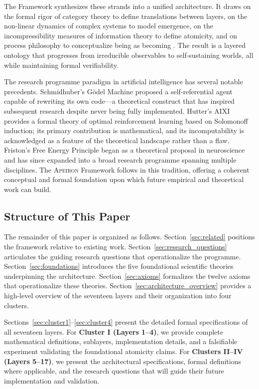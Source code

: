 The \Apeiron{} Framework synthesizes these strands into a unified architecture. It draws on the formal rigor of category theory to define translations between layers, on the non-linear dynamics of complex systems to model emergence, on the incompressibility measures of information theory to define atomicity, and on process philosophy to conceptualize being as becoming \cite{simondon1992}. The result is a layered ontology that progresses from irreducible observables to self-sustaining worlds, all while maintaining formal verifiability.

The research programme paradigm in artificial intelligence has several notable precedents. Schmidhuber's Gödel Machine \cite{schmidhuber2007} proposed a self-referential agent capable of rewriting its own code---a theoretical construct that has inspired subsequent research despite never being fully implemented. Hutter's AIXI \cite{hutter2005} provides a formal theory of optimal reinforcement learning based on Solomonoff induction; its primary contribution is mathematical, and its incomputability is acknowledged as a feature of the theoretical landscape rather than a flaw. Friston's Free Energy Principle \cite{friston2010} began as a theoretical proposal in neuroscience and has since expanded into a broad research programme spanning multiple disciplines. The \textsc{Apeiron} Framework follows in this tradition, offering a coherent conceptual and formal foundation upon which future empirical and theoretical work can build.

\subsection{Structure of This Paper}
\label{subsec:structure}

The remainder of this paper is organized as follows. Section~\ref{sec:related} positions the framework relative to existing work. Section~\ref{sec:research_questions} articulates the guiding research questions that operationalize the programme. Section~\ref{sec:foundations} introduces the five foundational scientific theories underpinning the architecture. Section~\ref{sec:axioms} formalizes the twelve axioms that operationalize these theories. Section~\ref{sec:architecture_overview} provides a high-level overview of the seventeen layers and their organization into four clusters.

Sections~\ref{sec:cluster1}--\ref{sec:cluster4} present the detailed formal specifications of all seventeen layers. For \textbf{Cluster I (Layers 1--4)}, we provide complete mathematical definitions, sublayers, implementation details, and a falsifiable experiment validating the foundational atomicity claims. For \textbf{Clusters II--IV (Layers 5--17)}, we present the architectural specifications, formal definitions where applicable, and the research questions that will guide their future implementation and validation.

